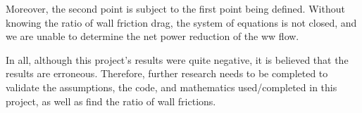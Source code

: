 Moreover, the second point is subject to the first point being defined. Without knowing the ratio of wall friction drag, the system of equations is not closed, and we are unable to determine the net power reduction of the \gls*{ww} flow.

In all, although this project's results were quite negative, it is believed that the results are erroneous. Therefore, further research needs to be completed to validate the assumptions, the code, and mathematics used/completed in this project, as well as find the ratio of wall frictions.

